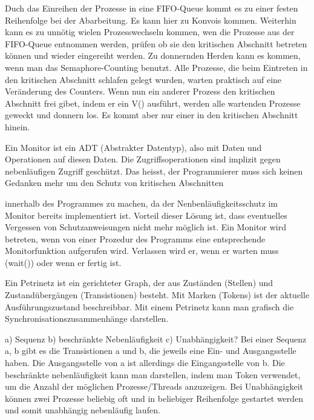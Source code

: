 \begin{answer}
Duch das Einreihen der Prozesse in eine FIFO-Queue kommt es zu einer festen Reihenfolge bei
der Abarbeitung. Es kann hier zu Konvois kommen. Weiterhin kann es zu unnötig wielen Prozesswechseln
kommen, wen die Prozesse aus der FIFO-Queue entnommen werden, prüfen ob sie den
kritischen Abschnitt betreten können und wieder eingereiht werden.
Zu donnernden Herden kann es kommen, wenn man das Semaphore-Counting benutzt. Alle Prozesse,
die beim Eintreten in den kritischen Abschnitt schlafen gelegt wurden, warten praktisch
auf eine Veränderung des Counters. Wenn nun ein anderer Prozess den kritischen Abschnitt frei
gibet, indem er ein V() ausführt, werden alle wartenden Prozesse geweckt und donnern los. Es
kommt aber nur einer in den kritischen Abschnitt hinein.
\end{answer}

\begin{answer}
Ein Monitor ist ein ADT (Abstrakter Datentyp), also mit Daten und Operationen auf diesen
Daten. Die Zugriffsoperationen sind implizit gegen nebenläufigen Zugriff geschützt. Das heisst,
der Programmierer muss sich keinen Gedanken mehr um den Schutz von kritischen Abschnitten

innerhalb des Programmes zu machen, da der Nenbenläufigkeitsschutz im Monitor bereits implementiert
ist. Vorteil dieser Lösung ist, dass eventuelles Vergessen von Schutzanweisungen nicht
mehr möglich ist.
Ein Monitor wird betreten, wenn von einer Prozedur des Programms eine entsprechende Monitorfunktion
aufgerufen wird. Verlassen wird er, wenn er warten muss (wait()) oder wenn er fertig
ist.
\end{answer}

\begin{answer}
Ein Petrinetz ist ein gerichteter Graph, der aus Zuständen (Stellen) und Zustandübergängen
(Transistionen) besteht. Mit Marken (Tokens) ist der aktuelle Ausführungszustand beschreibbar.
Mit einem Petrinetz kann man grafisch die Synchronisationszusammenhänge darstellen.
\end{answer}

\begin{answer}
a) Sequenz
b) beschränkte Nebenläufigkeit
c) Unabhängigkeit?
Bei einer Sequenz a, b gibt es die Transistionen a und b, die jeweils eine Ein- und Ausgangsstelle
haben. Die Ausgangsstelle von a ist allerdings die Eingangsstelle von b.
Die beschränkte nebenläufigkeit kann man darstellen, indem man Token verwendet, um die Anzahl
der möglichen Prozesse/Threads anzuzeigen.
Bei Unabhängigkeit können zwei Prozesse beliebig oft und in beliebiger Reihenfolge gestartet
werden und somit unabhängig nebenläufig laufen.
\end{answer}

